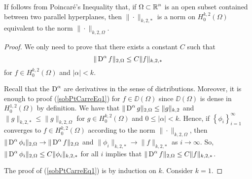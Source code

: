 \begin{rmk}
If follows from Poincaré's Inequality that, if
$\displaystyle \Omega \subset \mathbb{R}^n$ is an open subset contained between two
parallel hyperplanes, then $\|\cdot\|_{k,2,\ast}$ is a norm on
$\displaystyle H^{k,2}_0(\Omega)$ equivalent to the norm
$\|\cdot\|_{k,2,\Omega}$.  \label{ell_equivNorms}
\end{rmk}

\begin{proof}
We only need to prove that there exists a constant $C$ such that
\begin{equation} \label{sobPtCarreEq1}
  \| \operatorname{D}^\alpha f \|_{2,\Omega} \leq C \|f\|_{k,2,\ast}
\end{equation}
for $\displaystyle f \in H^{k,2}_0(\Omega)$ and $|\alpha|<k$.

Recall that the $\displaystyle \operatorname{D}^\alpha$ are derivatives in the sense of
distributions.  Moreover, it is enough to proof (\ref{sobPtCarreEq1}) for
$f \in \DD(\Omega)$ since $\DD(\Omega)$ is dense in
$\displaystyle H^{1,2}_0(\Omega)$
by definition.  We have that
$\displaystyle \| \operatorname{D}^\alpha g \|_{2,\Omega} \leq \|g\|_{k,2}$
and $\displaystyle \|g\|_{k,2,\ast} \leq \|g\|_{k,2,\Omega}$ for
$\displaystyle g \in H^{k,2}_0(\Omega)$ and $0\leq |\alpha|<k$.  Hence, if
$\displaystyle \left\{\phi_i\right\}_{i=1}^\infty$ converges to 
$\displaystyle f \in H^{k,2}_0(\Omega)$ according to the norm
$\|\cdot\|_{k,2,\Omega}$, then
$\displaystyle \| \operatorname{D}^\alpha \phi_i \|_{2,\Omega}
\rightarrow \| \operatorname{D}^\alpha f \|_{2,\Omega}$
and $\displaystyle \|\phi_i\|_{k,2,\ast} \rightarrow \|f\|_{k,2,\ast}$
as $i\rightarrow \infty$.  So,
$\displaystyle \| \operatorname{D}^\alpha \phi_i \|_{2,\Omega}
\leq C \|\phi_i\|_{k,2,\ast}$ for
all $i$ implies that
$\displaystyle \| \operatorname{D}^\alpha f \|_{2,\Omega} \leq C \|f\|_{k,2,\ast}$.

The proof of (\ref{sobPtCarreEq1}) is by induction on $k$.  Consider $k=1$.


\end{proof}
